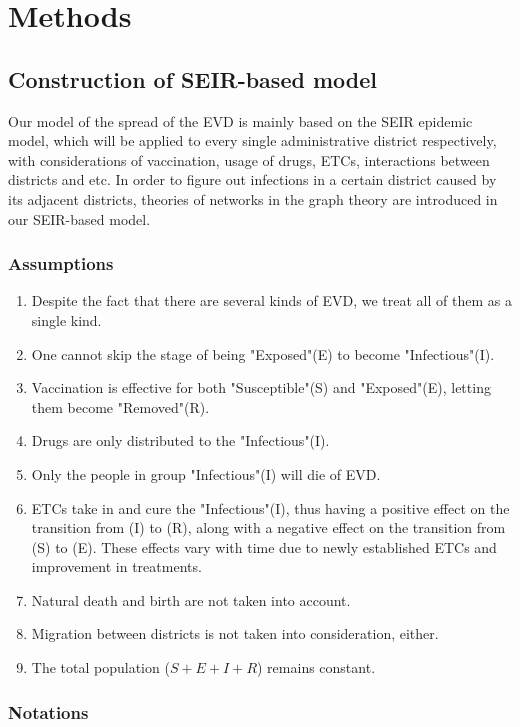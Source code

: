 \section{Methods}
\cite{kerm27}
\cite{who152}
\subsection{Construction of SEIR-based model}
Our model of the spread of the EVD is mainly based on the SEIR epidemic model, which will be applied to every single administrative district respectively, with considerations of vaccination, usage of drugs, ETCs, interactions between districts and etc. In order to figure out infections in a certain district caused by its adjacent districts, theories of networks in the graph theory are introduced in our SEIR-based model.

\subsubsection{Assumptions}
\begin{enumerate}
\item Despite the fact that there are several kinds of EVD, we treat all of them as a single kind.
\item One cannot skip the stage of being "Exposed"(E) to become "Infectious"(I).
\item Vaccination is effective for both "Susceptible"(S) and "Exposed"(E), letting them become "Removed"(R).
\item Drugs are only distributed to the "Infectious"(I).
\item Only the people in group "Infectious"(I) will die of EVD.
\item ETCs take in and cure the "Infectious"(I), thus having a positive effect on the transition from (I) to (R), along with a negative effect on the transition from (S) to (E). These effects vary with time due to newly established ETCs and improvement in treatments.
\item Natural death and birth are not taken into account.
\item Migration between districts is not taken into consideration, either.
\item The total population ($S+E+I+R$) remains constant.
\end{enumerate}

\subsubsection{Notations}

